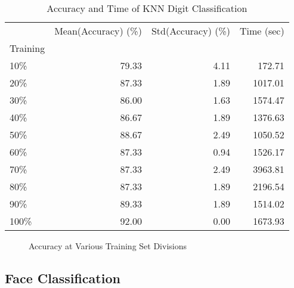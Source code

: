 \documentclass[10pt,parskip=half,
toc=sectionentrywithdots,
bibliography=totocnumbered,
captions=tableheading,numbers=noendperiod]{scrartcl}
\begin{document}
\begin{table}[H]
\caption{Accuracy and Time of KNN Digit Classification}\label{tbl:tlabel}
\centering
\begin{adjustbox}{max width=\textwidth}
\begin{tabular}{lrrr}
\toprule
{} &  Mean(Accuracy) (\%) &  Std(Accuracy) (\%) &  Time (sec) \\
Training &                     &                    &             \\
\midrule
10\%      &               79.33 &               4.11 &      172.71 \\
20\%      &               87.33 &               1.89 &     1017.01 \\
30\%      &               86.00 &               1.63 &     1574.47 \\
40\%      &               86.67 &               1.89 &     1376.63 \\
50\%      &               88.67 &               2.49 &     1050.52 \\
60\%      &               87.33 &               0.94 &     1526.17 \\
70\%      &               87.33 &               2.49 &     3963.81 \\
80\%      &               87.33 &               1.89 &     2196.54 \\
90\%      &               89.33 &               1.89 &     1514.02 \\
100\%     &               92.00 &               0.00 &     1673.93 \\
\bottomrule
\end{tabular}

\end{adjustbox}
\end{table}

\begin{figure}[H]\begin{center}\end{center}\caption{Accuracy at Various Training Set Divisions}\label{fig:flabel}\end{figure}

\hypertarget{face-classification}{%
\subsection{Face Classification}\label{face-classification}}
\end{document}
